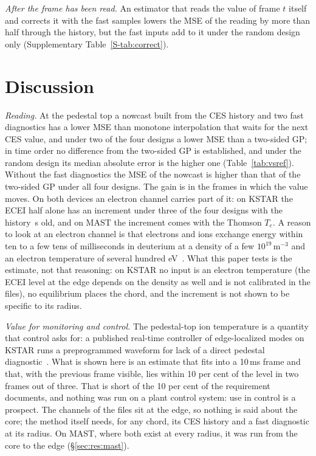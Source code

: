 \documentclass[11pt,a4paper]{article}
\newcommand{\Te}{\ensuremath{T_e}}
\newcommand{\SuppTab}[1]{Supplementary Table~\ref{S-#1}}
\begin{document}
\emph{After the frame has been read.} An estimator that reads the value of frame $t$
itself and corrects it with the fast samples lowers the MSE of the reading by more than
half through the history, but the fast inputs add to it under the random design only
(\SuppTab{tab:correct}).

\section{Discussion}
\label{sec:discussion}

\emph{Reading.} At the pedestal top a nowcast built from the CES history and two fast
diagnostics has a lower MSE than monotone interpolation that waits for the next CES
value, and under two of the four designs a lower MSE than a two-sided GP; in time order
no difference from the two-sided GP is established, and under the random design its
median absolute error is the higher one (Table~\ref{tab:vsref}). Without the fast
diagnostics the MSE of the nowcast is higher than that of the two-sided GP under all four
designs. The gain is in the frames in which the value moves. On both devices an
electron channel carries part of it: on KSTAR the ECEI half alone has an increment under
three of the four designs with the history \AgeMedianS\,s old, and on MAST the increment
comes with the Thomson \Te{}. A reason to look at an electron channel is that electrons
and ions exchange energy within ten to a few tens of milliseconds in deuterium at a
density of a few $10^{19}$\,m$^{-3}$ and an electron temperature of several hundred
eV~\citep{Wesson2011Tokamaks}. What this paper tests is the estimate, not that reasoning:
on KSTAR no input is an electron temperature (the ECEI level at the edge depends on the
density as well and is not calibrated in the files), no equilibrium places the chord, and
the increment is not shown to be specific to its radius.

\emph{Value for monitoring and control.} The pedestal-top ion temperature is a quantity
that control asks for: a published real-time controller of edge-localized modes on KSTAR
runs a preprogrammed waveform for lack of a direct pedestal
diagnostic~\citep{Shin2022PreemptiveDriven}. What is shown here is an estimate that
fits into a 10\,ms frame and that, with the previous frame visible, lies within 10 per
cent of the level in two frames out of three. That is short of the 10 per cent of the
requirement documents, and nothing was run on a plant control system: use in control is a
prospect. The channels of the files sit at the edge, so nothing is said about the core;
the method itself needs, for any chord, its CES history and a fast diagnostic at its
radius. On MAST, where both exist at every radius, it was run from the core to the edge
(\S\ref{sec:res:mast}).
\end{document}
